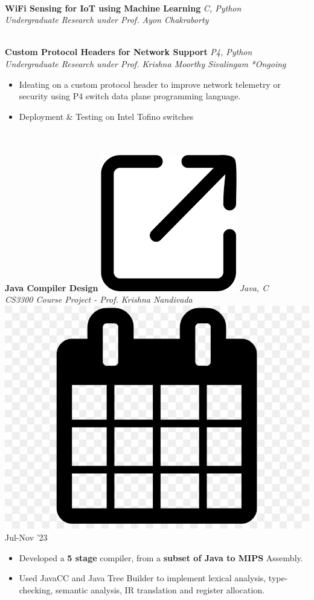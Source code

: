 \documentclass[article]{article}
\newcommand{\myMargin}{0.15in}
\newcommand{\resheading}[1]{{\small \colorbox{myblue} { \begin{minipage}{\dimexpr\linewidth-2\fboxsep}\centering{\textbf{#1 \vphantom{p\^{E}}}}\end{minipage}}}}
\newcommand{\myfont}[2]{\fontsize{#1}{#1}\selectfont #2}
\newcommand{\subheadingfont}[1]{\myfont{10pt}{#1}}
\newcommand{\projecttopic}[1]{\myfont{10pt}{\textbf{#1}}}
\newcommand{\projectdesc}[1]{\myfont{9pt}{\textcolor{projDescColor}{\textit{#1}}}}
\newcommand{\mylink}[1]{\href{#1}{\includegraphics[scale=0.03]{download.png}}}
\newcommand{\mycal}[1]{\includegraphics[scale=0.018]{calendar.png} \myfont{9}{#1}}
\begin{document}
\begin{multicols*}{2}
\noindent
\hrulefill \\ [-0.45cm]
\projecttopic{WiFi Sensing for IoT using Machine Learning} \hfill \textcolor{projDescColor}{\textit{C, Python}} \\ [0.1cm]
\projectdesc{Undergraduate Research under Prof. Ayon Chakraborty}
\vspace{5pt} 
\noindent
\hrulefill \\ [-0.45cm]
\projecttopic{Custom Protocol Headers for Network Support}   \hfill \textcolor{projDescColor}{\textit{P4, Python}}\\[0.1cm]
\projectdesc{Undergraduate Research under Prof. Krishna Moorthy Sivalingam} \hfill \textit{*Ongoing}
\vspace{1pt}
\begin{itemize}[leftmargin=\myMargin]
    \setlength \itemsep{-0.1em}
    \item Ideating on a custom protocol header to improve network telemetry or security using P4 switch data plane programming language.
    \item Deployment \& Testing on Intel Tofino switches  
\end{itemize}
\vspace{3pt}

\noindent
\resheading{\subheadingfont{PROJECTS} }\\[0.1cm]

\noindent
\hrulefill \\ [-0.45cm]
\projecttopic{Java Compiler Design}
\mylink{https://github.com/Snehadeep-Gayen/Compiler-Design-HW}
\hfill    \textcolor{projDescColor}{\textit{Java, C}}  \\[0.05cm]
\projectdesc{CS3300 Course Project - Prof. Krishna Nandivada} \hfill \mycal{Jul-Nov '23} \\
\noindent
\vspace{-0.4cm}
\begin{itemize}[leftmargin=\myMargin]
    \item Developed a \textbf{5 stage} compiler, from a \textbf{subset of Java to MIPS} Assembly.
    \item Used JavaCC and Java Tree Builder to implement lexical analysis, type-checking, semantic analysis, IR translation and register allocation.
\end{itemize}
\vspace{5pt}


\end{multicols*}
\end{document}
